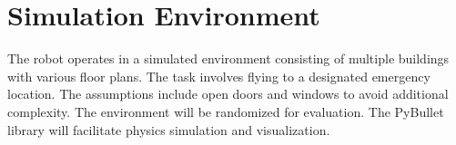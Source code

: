 \documentclass[a4paper, 11pt, conference]{ieeeconf}      %
\begin{document}
\section{Simulation Environment}
The robot operates in a simulated environment consisting of multiple buildings with various floor plans. The task involves flying to a designated emergency location. The assumptions include open doors and windows to avoid additional complexity. The environment will be randomized for evaluation. The PyBullet library will facilitate physics simulation and visualization.











 

\end{document}
